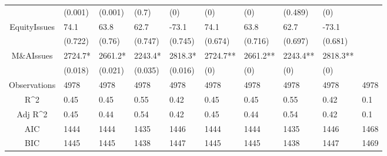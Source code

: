 \documentclass{article}
\begin{document}
\begin{table}[H]
\begin{tabular}{|clllllllll|}
   & (0.001) & (0.001) & (0.7) & (0) & (0) & (0) & (0.489) & (0) &  \\ 
  EquityIssues & 74.1 & 63.8 & 62.7 & -73.1 & 74.1 & 63.8 & 62.7 & -73.1 &  \\ 
   & (0.722) & (0.76) & (0.747) & (0.745) & (0.674) & (0.716) & (0.697) & (0.681) &  \\ 
  M\&AIssues & 2724.7* & 2661.2* & 2243.4* & 2818.3* & 2724.7** & 2661.2** & 2243.4** & 2818.3** &  \\ 
   & (0.018) & (0.021) & (0.035) & (0.016) & (0) & (0) & (0) & (0) &  \\ 
  \hline 
 Observations & 4978 & 4978 & 4978 & 4978 & 4978 & 4978 & 4978 & 4978 & 4978 \\ 
  R^2 & 0.45 & 0.45 & 0.55 & 0.42 & 0.45 & 0.45 & 0.55 & 0.42 & 0.1 \\ 
  Adj R^2 & 0.45 & 0.44 & 0.54 & 0.42 & 0.45 & 0.44 & 0.54 & 0.42 & 0.1 \\ 
  AIC & 1444 & 1444 & 1435 & 1446 & 1444 & 1444 & 1435 & 1446 & 1468 \\ 
  BIC & 1445 & 1445 & 1438 & 1447 & 1445 & 1445 & 1438 & 1447 & 1469 \\ 
   \hline
\end{tabular}
 
\end{table}
\end{document}
